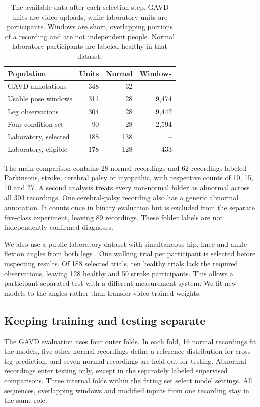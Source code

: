 \documentclass[letterpaper]{article}
\begin{document}
\begin{table}[t]
\centering
\begin{tabular}{lrrr}
\toprule
Population & Units & Normal & Windows \\
\midrule
GAVD annotations & 348 & 32 & -- \\
Usable pose windows & 311 & 28 & 9,474 \\
Leg observations & 304 & 28 & 9,442 \\
Four-condition set & 90 & 28 & 2,594 \\
Laboratory, selected & 188 & 138 & -- \\
Laboratory, eligible & 178 & 128 & 433 \\
\bottomrule
\end{tabular}
\caption{The available data after each selection step. GAVD units are video uploads, while laboratory units are participants. Windows are short, overlapping portions of a recording and are not independent people. Normal laboratory participants are labeled healthy in that dataset.}
\label{tab:attrition}
\end{table}

The main comparison contains 28 normal recordings and 62 recordings labeled Parkinsons, stroke, cerebral palsy or myopathic, with respective counts of 10, 15, 10 and 27. A second analysis treats every non-normal folder as abnormal across all 304 recordings. One cerebral-palsy recording also has a generic abnormal annotation. It counts once in binary evaluation but is excluded from the separate five-class experiment, leaving 89 recordings. These folder labels are not independently confirmed diagnoses.

We also use a public laboratory dataset with simultaneous hip, knee and ankle flexion angles from both legs \citep{vancriekinge2023dataset}. One walking trial per participant is selected before inspecting results. Of 188 selected trials, ten healthy trials lack the required observations, leaving 128 healthy and 50 stroke participants. This allows a participant-separated test with a different measurement system. We fit new models to the angles rather than transfer video-trained weights.

\subsection{Keeping training and testing separate}

The GAVD evaluation uses four outer folds. In each fold, 16 normal recordings fit the models, five other normal recordings define a reference distribution for cross-leg prediction, and seven normal recordings are held out for testing. Abnormal recordings enter testing only, except in the separately labeled supervised comparisons. Three internal folds within the fitting set select model settings. All sequences, overlapping windows and modified inputs from one recording stay in the same role.
\end{document}
